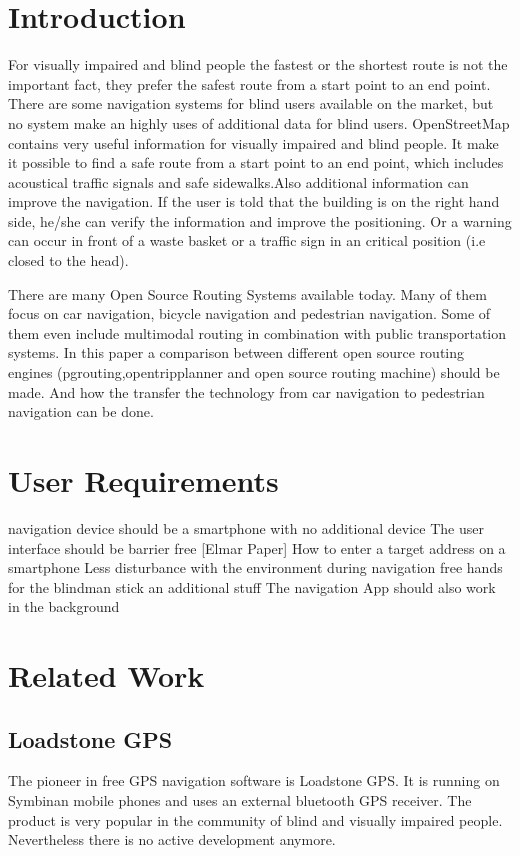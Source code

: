 \documentclass{sig-alternate}
\begin{document}

\section{Introduction}
For visually impaired and blind people the fastest or the shortest route is not the important fact, they prefer the safest route from a start point to an end point. There are some navigation systems for blind users available on the market, but no system make an highly uses of additional data for blind users. 
OpenStreetMap contains very useful information for visually impaired and blind people. It make it possible to find a safe route from a start point to an end point, which includes acoustical traffic signals and safe sidewalks.Also additional information can improve the navigation. If the user is told that the building is on the right hand side, he/she can verify the information and improve the positioning. Or a warning can occur in front of a waste basket or a traffic sign in an critical position (i.e closed to the head). 
 
There are many Open Source Routing Systems available today. Many of them focus on car navigation, bicycle navigation and pedestrian navigation. Some of them even include multimodal routing in combination with public transportation systems. In this paper a comparison between different open source routing engines (pgrouting,opentripplanner and open source routing machine) should be made. And how the transfer the technology from car navigation to pedestrian navigation can be done. 
\section{User Requirements}
navigation device should be a smartphone with no additional device
The user interface should be barrier free [Elmar Paper]
How to enter a target address on a smartphone
Less disturbance with the environment
during navigation free hands for the blindman stick an additional stuff
The navigation App should also work in the background

\section{Related Work}

\subsection{Loadstone GPS}
The pioneer in free GPS navigation software is Loadstone GPS\cite{loadstone}. It is running on Symbinan mobile phones and uses an external bluetooth GPS receiver. The product is very popular in the community of blind and visually impaired people. Nevertheless there is no active development anymore.
\end{document}
